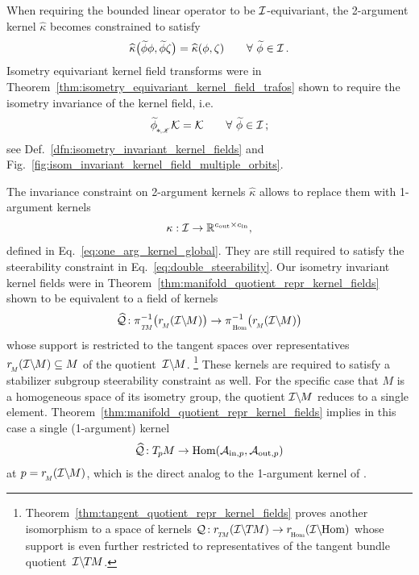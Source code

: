 When requiring the bounded linear operator to be $\mathcal{I}$-equivariant, the 2-argument kernel $\widehat{\kappa}$ becomes constrained to satisfy
\begin{align}
    \widehat{\kappa} \big( \widetilde{\phi}\phi, \widetilde{\phi}\zeta \big) = \widehat{\kappa} (\phi, \zeta)
    \qquad \forall\ \widetilde{\phi} \in\mathcal{I} \,.
\end{align}
Isometry equivariant kernel field transforms were in Theorem~\ref{thm:isometry_equivariant_kernel_field_trafos} shown to require the isometry invariance of the kernel field, i.e.
\begin{align}
    \widetilde{\phi}_{\overset{}{\mkern-2mu*\mkern-1mu\scalebox{.55}{$,\mkern-2mu\mathscr{K}\mkern2mu$}}} \K = \K
    \qquad \forall\ \widetilde{\phi} \in\I \,;
\end{align}
see Def.~\ref{dfn:isometry_invariant_kernel_fields} and Fig.~\ref{fig:isom_invariant_kernel_field_multiple_orbits}.


The invariance constraint on 2-argument kernels $\widehat{\kappa}$ allows to replace them with 1-argument kernels
\begin{align}
    \kappa: \mathcal{I} \to \mathbb{R}^{{c_\textup{out}}\times{c_\textup{in}}},
\end{align}
defined in Eq.~\eqref{eq:one_arg_kernel_global}.
They are still required to satisfy the steerability constraint in Eq.~\eqref{eq:double_steerability}.
Our isometry invariant kernel fields were in Theorem~\ref{thm:manifold_quotient_repr_kernel_fields} shown to be equivalent to a field of kernels
\begin{align}
    \Qhat \mkern-2mu: \piTM^{-1}\big( \rM(\IM) \big) \to \piHom^{-1}\big( \rM(\IM) \big)
\end{align}
whose support is restricted to the tangent spaces over representatives $\rM(\IM) \subseteq M$ of the quotient~$\mathcal{I}\backslash\mkern-1.5mu M$.%
\footnote{
    Theorem~\ref{thm:tangent_quotient_repr_kernel_fields} proves another isomorphism to a space of kernels $\Q \mkern-2mu: \rTM(\ITM) \to \rHom(\IHom)$ whose support is even further restricted to representatives of the tangent bundle quotient~$\mathcal{I}\backslash\mkern-1.5mu T\mkern-1.5mu M$.
}
These kernels are required to satisfy a stabilizer subgroup steerability constraint as well.
For the specific case that $M$ is a homogeneous space of its isometry group, the quotient $\mathcal{I}\backslash\mkern-1.5mu M$ reduces to a single element.
Theorem~\ref{thm:manifold_quotient_repr_kernel_fields} implies in this case a single (1-argument) kernel
\begin{align}\label{eq:Qhat_homogeneous_rel_work_section}
    \widehat{\mathcal{Q}} \mkern-2mu: T_{\mkern-1.5mu p}\mkern-.5muM \to \operatorname{Hom}(\mathcal{A}_{\textup{in},p}, \mathcal{A}_{\textup{out},p})
\end{align}
at $p = \rM(\IM)$, which is the direct analog to the 1-argument kernel of \citet{Cohen2018-intertwiners}\cite{Cohen2019-generaltheory}.


